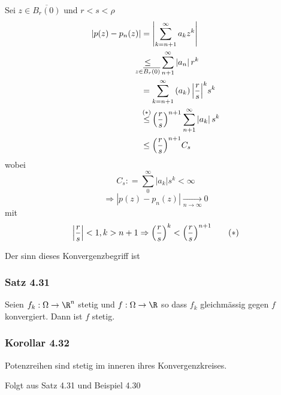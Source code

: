 \begin{beweis}{}
Sei $z\in\overline{B_r(0)}$ und $r<s<\rho$ 
\begin{align*}
\left| {p(z) - {p_n}(z)} \right| &= \left| {\sum\limits_{k = n + 1}^\infty  {{a_k}{z^k}} } \right|\\
&\hspace{-3mm}\mathop  \le \limits_{z \in \overline {{B_r}(0)} } \sum\limits_{n + 1}^\infty  {\left| {{a_n}} \right|{r^k}} \\
& = \sum\limits_{k = n + 1}^\infty  {\left( {{a_k}} \right){{\left| {\frac{r}{s}} \right|}^k}{s^k}} \\
&\mathop  \le \limits^{{\left( \text{\textasteriskcentered} \right)}} 
{\left( {\frac{r}{s}} \right)^{n + 1}}\sum\limits_{n + 1}^\infty  {\left| {{a_k}} \right|{s^k}} \\
 &\le {\left( {\frac{r}{s}} \right)^{n + 1}}{C_s}
\end{align*}
wobei
\[{C_s}: = \sum\limits_0^\infty  {\left| {{a_k}} \right|{s^k} < \infty } \]
\[\Rightarrow\left| {p(z) - {p_n}(z)} \right|\mathop  \to \limits_{n \to \infty } 0\]
mit 
\[\left| {\frac{r}{s}} \right| < 1,k > n + 1 \Rightarrow {\left( {\frac{r}{s}} \right)^k} < {\left( {\frac{r}{s}} \right)^{n + 1}}\tag{\text{\textasteriskcentered}}\]
\end{beweis}
Der sinn dieses Konvergenzbegriff ist
\subsubsection*{Satz 4.31}
Seien $f_k:\Omega\to\R^n$ stetig und $f:\Omega\to\R$ so dass $f_k$ gleichmässig gegen $f$ konvergiert. Dann ist $f$ stetig.
\subsubsection*{Korollar 4.32}
Potenzreihen sind stetig im inneren ihres Konvergenzkreises. 
\begin{beweis}{}
Folgt aus Satz 4.31 und Beispiel 4.30
\end{beweis}

